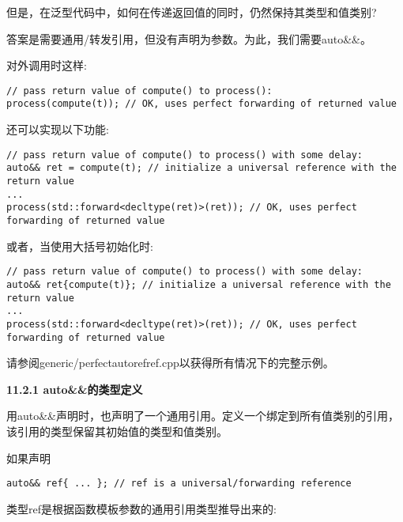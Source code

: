 但是，在泛型代码中，如何在传递返回值的同时，仍然保持其类型和值类别?\par

答案是需要通用/转发引用，但没有声明为参数。为此，我们需要auto\&\&。\par

对外调用时这样:\par

\begin{lstlisting}[caption={}]
// pass return value of compute() to process():
process(compute(t)); // OK, uses perfect forwarding of returned value
\end{lstlisting}

还可以实现以下功能:\par

\begin{lstlisting}[caption={}]
// pass return value of compute() to process() with some delay:
auto&& ret = compute(t); // initialize a universal reference with the return value
...
process(std::forward<decltype(ret)>(ret)); // OK, uses perfect forwarding of returned value
\end{lstlisting}

或者，当使用大括号初始化时:\par

\begin{lstlisting}[caption={}]
// pass return value of compute() to process() with some delay:
auto&& ret{compute(t)}; // initialize a universal reference with the return value
...
process(std::forward<decltype(ret)>(ret)); // OK, uses perfect forwarding of returned value
\end{lstlisting}

请参阅generic/perfectautorefref.cpp以获得所有情况下的完整示例。\par

\hspace*{\fill} \par %
\textbf{11.2.1 auto\&\&的类型定义}

用auto\&\&声明时，也声明了一个通用引用。定义一个绑定到所有值类别的引用，该引用的类型保留其初始值的类型和值类别。\par

如果声明\par

\begin{lstlisting}[caption={}]
auto&& ref{ ... }; // ref is a universal/forwarding reference
\end{lstlisting}

类型ref是根据函数模板参数的通用引用类型推导出来的:\par

